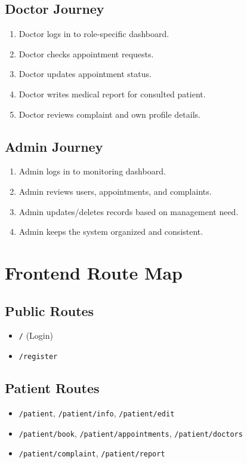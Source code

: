 \documentclass[12pt,a4paper]{article}
\begin{document}
\subsection{Doctor Journey}
\begin{enumerate}[leftmargin=1.2cm]
    \item Doctor logs in to role-specific dashboard.
    \item Doctor checks appointment requests.
    \item Doctor updates appointment status.
    \item Doctor writes medical report for consulted patient.
    \item Doctor reviews complaint and own profile details.
\end{enumerate}

\subsection{Admin Journey}
\begin{enumerate}[leftmargin=1.2cm]
    \item Admin logs in to monitoring dashboard.
    \item Admin reviews users, appointments, and complaints.
    \item Admin updates/deletes records based on management need.
    \item Admin keeps the system organized and consistent.
\end{enumerate}

\section{Frontend Route Map}
\subsection{Public Routes}
\begin{itemize}[leftmargin=1.2cm]
    \item \texttt{/} (Login)
    \item \texttt{/register}
\end{itemize}

\subsection{Patient Routes}
\begin{itemize}[leftmargin=1.2cm]
    \item \texttt{/patient}, \texttt{/patient/info}, \texttt{/patient/edit}
    \item \texttt{/patient/book}, \texttt{/patient/appointments}, \texttt{/patient/doctors}
    \item \texttt{/patient/complaint}, \texttt{/patient/report}
\end{itemize}
\end{document}
